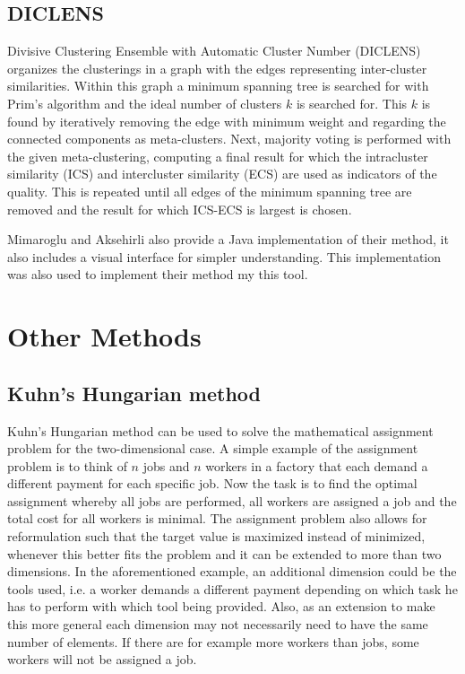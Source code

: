\documentclass[
	a4paper,
	english,
	twoside,
	openright,               
	11pt                            
	]{report}
\begin{document}
\subsection{DICLENS}
Divisive Clustering Ensemble with Automatic Cluster Number (DICLENS) \cite{DICLENS} organizes the clusterings in a graph with the edges representing inter-cluster similarities. Within this graph a minimum spanning tree is searched for with Prim's algorithm \cite{prim} and the ideal number of clusters $k$ is searched for. This $k$ is found by iteratively removing the edge with minimum weight and regarding the connected components as meta-clusters. Next, majority voting is performed with the given meta-clustering, computing a final result for which the intracluster similarity (ICS) and intercluster similarity (ECS) are used as indicators of the quality. This is repeated until all edges of the minimum spanning tree are removed and the result for which ICS-ECS is largest is chosen.

Mimaroglu and Aksehirli \cite{DICLENS} also provide a Java implementation of their method, it also includes a visual interface for simpler understanding. This implementation was also used to implement their method my this tool.

\section{Other Methods}

\subsection{Kuhn’s Hungarian method}
Kuhn’s Hungarian method \cite{Kuhn2010} can be used to solve the mathematical assignment problem for the two-dimensional case. A simple example of the assignment problem is to think of $n$ jobs and $n$ workers in a factory that each demand a different payment for each specific job. Now the task is to find the optimal assignment whereby all jobs are performed, all workers are assigned a job and the total cost for all workers is minimal. The assignment problem also allows for reformulation such that the target value is maximized instead of minimized, whenever this better fits the problem and it can be extended to more than two dimensions. In the aforementioned example, an additional dimension could be the tools used, i.e. a worker demands a different payment depending on which task he has to perform with which tool being provided. Also, as an extension to make this more general each dimension may not necessarily need to have the same number of elements. If there are for example more workers than jobs, some workers will not be assigned a job.
\end{document}
